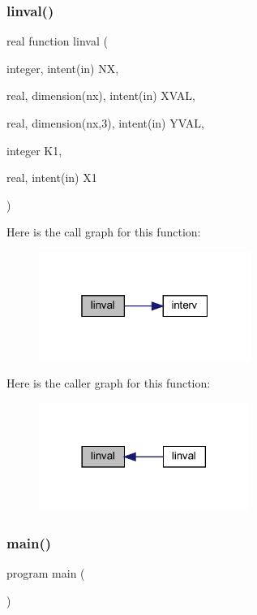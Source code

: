 \subsubsection{\texorpdfstring{linval()}{linval()}}
{\footnotesize\ttfamily real function linval (\begin{DoxyParamCaption}\item[{integer, intent(in)}]{NX,  }\item[{real, dimension(nx), intent(in)}]{X\+V\+AL,  }\item[{real, dimension(nx,3), intent(in)}]{Y\+V\+AL,  }\item[{integer}]{K1,  }\item[{real, intent(in)}]{X1 }\end{DoxyParamCaption})}

Here is the call graph for this function\+:\nopagebreak
\begin{figure}[H]
\begin{center}
\leavevmode
\includegraphics[width=196pt]{Leroi_8f90_accb3ec8ce6fe855a60b0c1959fc6e2c8_cgraph}
\end{center}
\end{figure}
Here is the caller graph for this function\+:\nopagebreak
\begin{figure}[H]
\begin{center}
\leavevmode
\includegraphics[width=194pt]{Leroi_8f90_accb3ec8ce6fe855a60b0c1959fc6e2c8_icgraph}
\end{center}
\end{figure}
\mbox{\label{Leroi_8f90_a8ec2266d83cd6c0b762cbcbc92c0af3d}} 
\subsubsection{\texorpdfstring{main()}{main()}}
{\footnotesize\ttfamily program main (\begin{DoxyParamCaption}{ }\end{DoxyParamCaption})}

